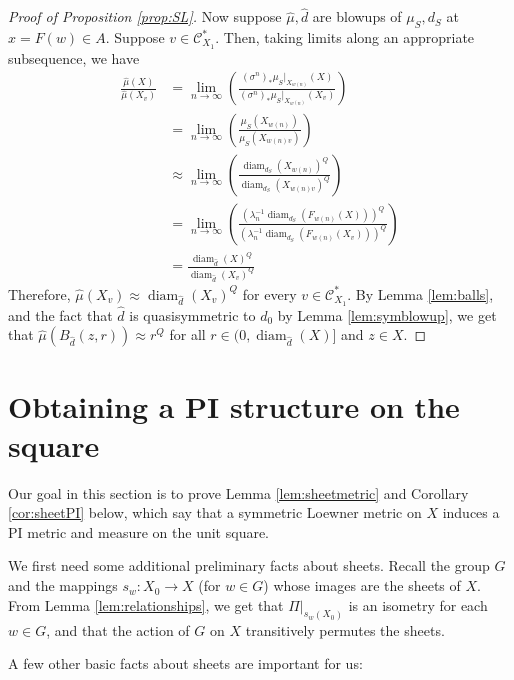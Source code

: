 \documentclass{amsart}
\DeclareMathOperator{\diam}{diam}
\theoremstyle{plain}
\theoremstyle{definition}
\numberwithin{equation}{section}
\numberwithin{theorem}{section}
\newcommand{\cC}{\mathcal{C}}
\begin{document}
\begin{proof}[Proof of Proposition \ref{prop:SL}]
Now suppose $\hat{\mu},\hat{d}$ are blowups of $\mu_S, d_S$ at $x=F(w)\in A$. Suppose $v\in \cC_{X_1}^*$. Then, taking limits along an appropriate subsequence, we have
\begin{align*}
\frac{\hat{\mu}(X)}{\hat{\mu}(X_v)} &= \lim_{n\rightarrow\infty}\left(\frac{(\sigma^n)_* \mu_S|_{X_{w(n)}}(X)}{(\sigma^n)_* \mu_S|_{X_{w(n)}}(X_v)}\right)\\
&= \lim_{n\rightarrow\infty}\left(\frac{\mu_S(X_{w(n)})}{\mu_S(X_{w(n)v})}\right)\\
&\approx \lim_{n\rightarrow\infty}\left(\frac{\diam_{d_S}(X_{w(n)})^Q}{\diam_{d_S}(X_{w(n)v})^Q}\right)\\
&= \lim_{n\rightarrow\infty}\left(\frac{(\lambda_n^{-1}\diam_{d_S}(F_{w(n)}(X)))^Q}{(\lambda_n^{-1}\diam_{d_S}(F_{w(n)}(X_v)))^Q}\right)\\
&= \frac{\diam_{\hat{d}}(X)^Q}{\diam_{\hat{d}}(X_v)^Q}
\end{align*}
Therefore, $\hat{\mu}(X_v)\approx \diam_{\hat{d}}(X_{v})^Q$ for every $v\in\cC_{X_1}^*$. By Lemma \ref{lem:balls}, and the fact that $\hat{d}$ is quasisymmetric to $d_0$ by Lemma \ref{lem:symblowup}, we get that $\hat{\mu}(B_{\hat{d}}(z,r))\approx r^Q$ for all $r\in (0,\diam_{\hat{d}}(X)]$ and $z\in X$.

\end{proof}



\section{Obtaining a PI structure on the square}

Our goal in this section is to prove Lemma \ref{lem:sheetmetric} and Corollary \ref{cor:sheetPI} below, which say that a symmetric Loewner metric on $X$ induces a PI metric and measure on the unit square.

We first need some additional preliminary facts about sheets. Recall the group $G$ and the mappings $s_w\colon X_0 \rightarrow X$ (for $w\in G$) whose images are the sheets of $X$. From Lemma \ref{lem:relationships}, we get that $\Pi|_{s_w(X_0)}$ is an isometry for each $w\in G$, and that the action of $G$ on $X$ transitively permutes the sheets.

A few other basic facts about sheets are important for us:
\end{document}
